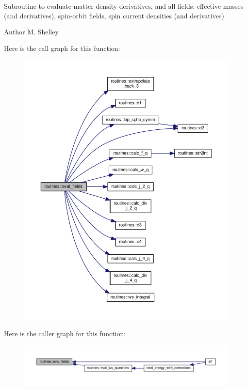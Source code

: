 Subroutine to evaluate matter density derivatives, and all fields\+: effective masses (and derivatives), spin-\/orbit fields, spin current densities (and derivatives) 

\begin{DoxyAuthor}{Author}
M. Shelley 
\end{DoxyAuthor}
Here is the call graph for this function\+:
\nopagebreak
\begin{figure}[H]
\begin{center}
\leavevmode
\includegraphics[width=350pt]{namespaceroutines_aa995449a9eb9c404dbd756bdbea180a2_cgraph}
\end{center}
\end{figure}
Here is the caller graph for this function\+:
\nopagebreak
\begin{figure}[H]
\begin{center}
\leavevmode
\includegraphics[width=350pt]{namespaceroutines_aa995449a9eb9c404dbd756bdbea180a2_icgraph}
\end{center}
\end{figure}
\mbox{\label{namespaceroutines_ae210968d134fbcc79297971cc4fefb82}} 
